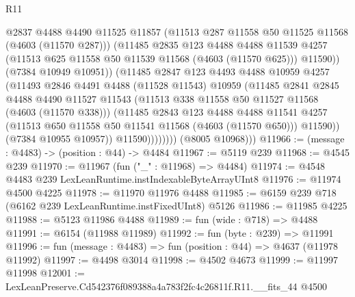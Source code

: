 \begin{lexlean}{R11}
\begin{coremodule}
                          @2837
                          @4488
                          @4490
                          @11525
                          @11857
                          (@11513 @287 @11558 @50 @11525 @11568 (@4603 (@11570 @287)))
                          (@11485
                            @2835
                            @123
                            @4488
                            @4488
                            @11539
                            @4257
                            (@11513 @625 @11558 @50 @11539 @11568 (@4603 (@11570 @625)))
                            @11590))
                        (@7384 @10949 @10951))
                      (@11485
                        @2847
                        @123
                        @4493
                        @4488
                        @10959
                        @4257
                        (@11493
                          @2846
                          @4491
                          @4488
                          (@11528 @11543)
                          @10959
                          (@11485
                            @2841
                            @2845
                            @4488
                            @4490
                            @11527
                            @11543
                            (@11513 @338 @11558 @50 @11527 @11568 (@4603 (@11570 @338)))
                            (@11485
                              @2843
                              @123
                              @4488
                              @4488
                              @11541
                              @4257
                              (@11513 @650 @11558 @50 @11541 @11568 (@4603 (@11570 @650)))
                              @11590))
                          (@7384 @10955 @10957))
                        @11590))))))))
        (@8005 @10968)))
@11966 := (message : @4483) -> (position : @44) -> @4484
@11967 := @5119 @239
@11968 := @4545 @239
@11970 := @11967 (fun ("_" : @11968) => @4484)
@11974 := @4548 @4483 @239 LexLeanRuntime.instIndexableByteArrayUInt8
@11976 := @11974 @4500 @4225
@11978 := @11970 @11976 @4488
@11985 := @6159 @239 @718 (@6162 @239 LexLeanRuntime.instFixedUInt8) @5126
@11986 := @11985 @4225
@11988 := @5123 @11986 @4488
@11989 := fun (wide : @718) => @4488
@11991 := @6154 (@11988 @11989)
@11992 := fun (byte : @239) => @11991
@11996 := fun (message : @4483) => fun (position : @44) => @4637 (@11978 @11992)
@11997 := @4498 @3014
@11998 := @4502 @4673
@11999 := @11997 @11998
@12001 := LexLeanPreserve.Cd542376f089388a4a783f2fc4c26811f.R11.__fits_44 @4500

\end{coremodule}
\end{lexlean}
